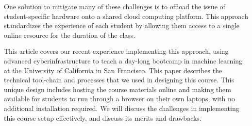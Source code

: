 One solution to mitigate many of these challenges is to offload the issue of
student-specific hardware onto a shared cloud computing platform. This approach
standardizes the experience of each student by allowing them access to a single
online resource for the duration of the class.

This article covers our recent experience implementing this approach, using
advanced cyberinfrastructure to teach a day-long bootcamp in machine learning at
the University of California in San Francisco. This paper describes the
technical tool-chain and processes that we used in designing this course. This
unique design includes hosting the course materials online and
making them available for students to run through a browser on their own laptops,
with no additional installation required. We will discuss the challenges in
implementing this course setup effectively, and discuss its merits and
drawbacks.
